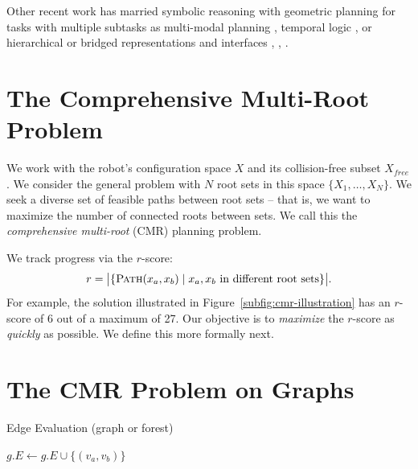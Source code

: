 \documentclass{report}
\begin{document}
Other recent work has married symbolic reasoning with geometric planning
for tasks with multiple subtasks
as multi-modal planning \cite{hauser2010multi},
temporal logic \cite{bhatia2010temporalgoals},
or hierarchical or bridged representations and interfaces
\cite{cambon2009hybrid}, \cite{gravot2005asymov},
\cite{srivastava2014taskmotion}.

\section{The Comprehensive Multi-Root Problem}
\label{sec:def}

We work with the robot's configuration space $X$
and its collision-free subset $X_{free}$.
We consider the general problem with $N$ root sets in this space
$\{ X_1, \dots, X_N \}$.
We seek a diverse set of feasible paths between root sets
-- that is, we want to maximize the number of connected roots between sets. 
We call this the \emph{comprehensive multi-root} (CMR) planning problem.

We track progress via the $r$-score:
\begin{equation}
   r = \big| \{
      \textsc{Path}(x_a,x_b) \;|\; x_a,x_b~\text{in different root sets}
      \} \big|.
   \label{eqn:obj}
\end{equation}
For example, the solution illustrated in Figure~\ref{subfig:cmr-illustration}
has an $r$-score of 6 out of a maximum of 27.
Our objective is to \emph{maximize} the $r$-score as \emph{quickly} as
possible.
We define this more formally next.

\section{The CMR Problem on Graphs}
\label{sec:cmr-graphs}

\begin{algorithm}[t]
\caption{Edge Evaluation (graph or forest)}
\begin{algorithmic}[1]
{}
\State \Return {}
\EndIf
{}
\State $g.E \leftarrow g.E \cup \{ (v_{a}, v_{b}) \}$
\EndIf
\EndProcedure
\end{algorithmic}
\label{alg:edge-evaluators}
\end{algorithm}
\end{document}
